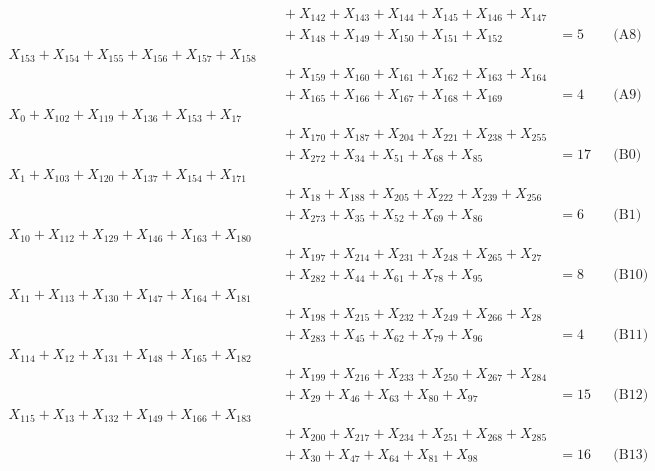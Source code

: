 \documentclass[a4paper,10pt]{article}
\begin{document}
{\begin{align}
&\quad  + X_{142} + X_{143} + X_{144} + X_{145} + X_{146} + X_{147} \\[0.5ex]
&\quad  + X_{148} + X_{149} + X_{150} + X_{151} + X_{152} &= 5 && \text{(A8)} \\
X_{153} + X_{154} + X_{155} + X_{156} + X_{157} + X_{158} \\[0.5ex]
&\quad  + X_{159} + X_{160} + X_{161} + X_{162} + X_{163} + X_{164} \\[0.5ex]
&\quad  + X_{165} + X_{166} + X_{167} + X_{168} + X_{169} &= 4 && \text{(A9)} \\
X_{0} + X_{102} + X_{119} + X_{136} + X_{153} + X_{17} \\[0.5ex]
&\quad  + X_{170} + X_{187} + X_{204} + X_{221} + X_{238} + X_{255} \\[0.5ex]
&\quad  + X_{272} + X_{34} + X_{51} + X_{68} + X_{85} &= 17 && \text{(B0)} \\
X_{1} + X_{103} + X_{120} + X_{137} + X_{154} + X_{171} \\[0.5ex]
&\quad  + X_{18} + X_{188} + X_{205} + X_{222} + X_{239} + X_{256} \\[0.5ex]
&\quad  + X_{273} + X_{35} + X_{52} + X_{69} + X_{86} &= 6 && \text{(B1)} \\
X_{10} + X_{112} + X_{129} + X_{146} + X_{163} + X_{180} \\[0.5ex]
&\quad  + X_{197} + X_{214} + X_{231} + X_{248} + X_{265} + X_{27} \\[0.5ex]
&\quad  + X_{282} + X_{44} + X_{61} + X_{78} + X_{95} &= 8 && \text{(B10)} \\
\allowbreak
X_{11} + X_{113} + X_{130} + X_{147} + X_{164} + X_{181} \\[0.5ex]
&\quad  + X_{198} + X_{215} + X_{232} + X_{249} + X_{266} + X_{28} \\[0.5ex]
&\quad  + X_{283} + X_{45} + X_{62} + X_{79} + X_{96} &= 4 && \text{(B11)} \\
X_{114} + X_{12} + X_{131} + X_{148} + X_{165} + X_{182} \\[0.5ex]
&\quad  + X_{199} + X_{216} + X_{233} + X_{250} + X_{267} + X_{284} \\[0.5ex]
&\quad  + X_{29} + X_{46} + X_{63} + X_{80} + X_{97} &= 15 && \text{(B12)} \\
X_{115} + X_{13} + X_{132} + X_{149} + X_{166} + X_{183} \\[0.5ex]
&\quad  + X_{200} + X_{217} + X_{234} + X_{251} + X_{268} + X_{285} \\[0.5ex]
&\quad  + X_{30} + X_{47} + X_{64} + X_{81} + X_{98} &= 16 && \text{(B13)} \\

\end{align}}
\end{document}

